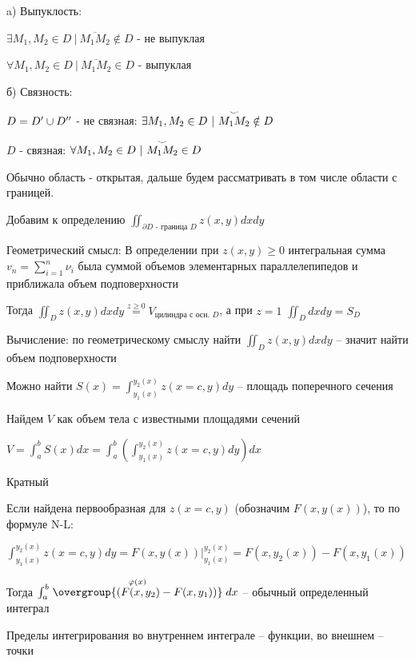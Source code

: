 \documentclass[12pt]{article}
\begin{document}
    a) Выпуклость:

    $\exists M_1, M_2 \in D \ | \ \overline{M_1 M_2} \notin D$ - не выпуклая

    $\forall M_1, M_2 \in D \ | \ \overline{M_1 M_2} \in D$ - выпуклая

    б) Связность:

    $D = D^\prime \cup D^{\prime\prime}$ - не связная: $\exists M_1, M_2 \in D \ | \ \overset{\LARGE\smile}{M_1 M_2} \notin D$

    $D$ - связная: $\forall M_1, M_2 \in D \ | \ \overset{\LARGE\smile}{M_1 M_2} \in D$

    Обычно область - открытая, дальше будем рассматривать в том числе области с границей.

    Добавим к определению $\iint_{\partial D \text{ - граница } D} z(x, y) dx dy$

    Геометрический смысл: В определении при $z(x, y) \geq 0$ интегральная сумма $v_n = \sum_{i=1}^n \nu_i$ была суммой объемов элементарных параллелепипедов и приближала объем подповерхности

    Тогда $\iint_D z(x, y) dx dy \stackrel{z \geq 0}{=} V_{\text{цилиндра с осн. } D}$, а при $z = 1$ $\iint_D dx dy = S_D$

    \hypertarget{doubleintegralcalculation}{}

    Вычисление: по геометрическому смыслу найти $\iint_D z(x, y) dx dy$ -- значит найти объем подповерхности

    Можно найти $S(x) = \int^{y_2(x)}_{y_1(x)} z(x = c, y) dy$ -- площадь поперечного сечения

    Найдем $V$ как объем тела с известными площадями сечений

    $V = \int^b_a S(x) dx = \int_a^b \left(\int^{y_2(x)}_{y_1(x)} z(x = c, y) dy\right) dx$

    \hypertarget{multipleintegral}{}

    \Nota Кратный

    Если найдена первообразная для $z(x = c, y)$ (обозначим $F(x, y(x))$), то по формуле N-L:

    $\int^{y_2(x)}_{y_1(x)} z(x = c, y) dy = F(x, y(x)) \Big|^{y_2(x)}_{y_1(x)} = F(x, y_2(x)) - F(x, y_1(x))$

    Тогда $\int^b_a \stackrel{\varphi(x)}{\overgroup{(F(x, y_2) - F(x, y_1))}} dx$ -- обычный определенный интеграл

    Пределы интегрирования во внутреннем интеграле -- функции, во внешнем -- точки
\end{document}
